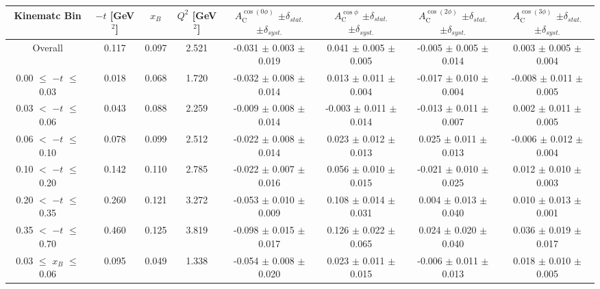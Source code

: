 {\begin{table}[width=15cm]
 \begin{center}
\resizebox{16cm}{!} {
  \begin{tabular}{|c|c|c|c|c|c|c|c|}
\hline
Kinematc Bin &  $-t$ [GeV$^{2}$] & $x_{B}$ & $Q^{2}$ [GeV$^{2}$] & 
$A_{\textrm{C}}^{\cos(0\phi)}$ $\pm \delta_{stat.}$ $\pm \delta_{syst.}$ & $A_{\textrm{C}}^{\cos\phi}$ $\pm \delta_{stat.}$ $\pm \delta_{syst.}$
& $A_{\textrm{C}}^{\cos(2\phi)}$ $\pm \delta_{stat.}$ $\pm \delta_{syst.}$ & $A_{\textrm{C}}^{\cos(3\phi)}$ $\pm \delta_{stat.}$ $\pm \delta_{syst.}$ \\
\hline
\hline
Overall &  0.117 & 0.097 &  2.521 &  -0.031 $\pm$  0.003 $\pm$  0.019 & 
0.041  $\pm$  0.005 $\pm$   0.005 &  -0.005  $\pm$  0.005  $\pm$   0.014 &  0.003  $\pm$   0.005   $\pm$   0.004 \\
\hline
0.00 $\leqslant$ $-t$ $\leqslant$ 0.03 &  0.018 & 0.068 &  1.720 &  -0.032  $\pm$  0.008 $\pm$ 0.014 & 
0.013  $\pm$  0.011  $\pm$   0.004 &  -0.017  $\pm$  0.010 $\pm$  0.004 &  -0.008   $\pm$  0.011   $\pm$   0.005\\
0.03 $<$ $-t$ $\leqslant$ 0.06 &  0.043 & 0.088 &  2.259& -0.009  $\pm$  0.008  $\pm$   0.014 &
 -0.003 $\pm$  0.011  $\pm$   0.014 &  -0.013  $\pm$  0.011  $\pm$  0.007 &  0.002   $\pm$  0.011   $\pm$   0.005\\
0.06 $<$ $-t$ $\leqslant$ 0.10 &  0.078 & 0.099 &  2.512 & -0.022  $\pm$  0.008  $\pm$  0.014 & 
0.023 $\pm$  0.012  $\pm$   0.013 & 0.025  $\pm$  0.011 $\pm$   0.013 &  -0.006   $\pm$  0.012  $\pm$    0.004\\
0.10 $<$ $-t$ $\leqslant$ 0.20 &  0.142 & 0.110 &  2.785 &  -0.022  $\pm$  0.007   $\pm$  0.016 & 
0.056 $\pm$  0.010  $\pm$   0.015 &  -0.021  $\pm$  0.010  $\pm$  0.025 & 0.012   $\pm$  0.010    $\pm$  0.003\\
0.20 $<$ $-t$ $\leqslant$ 0.35 &  0.260 & 0.121 &  3.272 &  -0.053 $\pm$   0.010  $\pm$  0.009 &
0.108 $\pm$  0.014  $\pm$ 0.031 & 0.004 $\pm$   0.013  $\pm$  0.040 & 0.010  $\pm$   0.013   $\pm$   0.001\\
0.35 $<$ $-t$ $\leqslant$ 0.70 &  0.460 & 0.125 &  3.819 &  -0.098  $\pm$  0.015  $\pm$   0.017 & 
0.126 $\pm$  0.022  $\pm$   0.065 & 0.024 $\pm$   0.020  $\pm$  0.040 & 0.036   $\pm$  0.019   $\pm$ 0.017\\
\hline
0.03 $\leqslant$ $x_{B}$ $\leqslant$ 0.06 &  0.095 & 0.049 &  1.338 &  -0.054  $\pm$  0.008  $\pm$   0.020 & 
0.023  $\pm$  0.011  $\pm$   0.015 & -0.006 $\pm$  0.011 $\pm$  0.013 &  0.018   $\pm$  0.010  $\pm$    0.005\\

\end{tabular}}
\end{center}
\end{table}}

